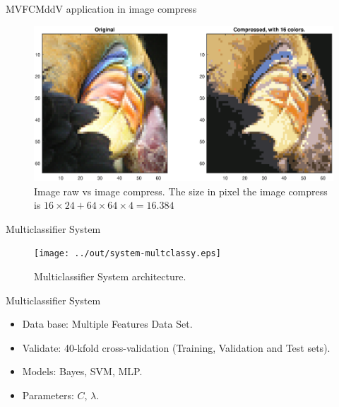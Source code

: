 \documentclass{beamer}
\begin{document}
\begin{frame}{MVFCMddV application in image compress}
\begin{figure}[h]
\centering
\includegraphics[width=4.5in]{../out/image-compress-16.eps}
\caption{Image raw vs image compress. The size in pixel the image compress is $16\times24 + 64\times64\times4 = 16.384$}
\label{fig:image_compress}
\end{figure}
\end{frame}




\begin{frame}{Multiclassifier System}
\begin{figure}[h]
\centering
\texttt{[image: ../out/system-multclassy.eps]}
\caption{Multiclassifier System architecture.}
\label{fig:mult_system_classy}
\end{figure}  
\end{frame}

\begin{frame}{Multiclassifier System}
\begin{itemize}
\item Data base: Multiple Features Data Set.
\item Validate: 40-kfold cross-validation (Training, Validation and Test sets).
\item Models: Bayes, SVM, MLP. 
\item Parameters: $C$, $\lambda$.
\end{itemize}
\end{frame}
\end{document}
